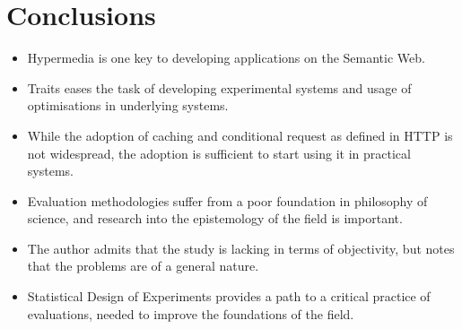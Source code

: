 \section{Conclusions}\label{sec:conclusions}

\begin{itemize}
\item Hypermedia is one key to developing applications on the Semantic
  Web.
\item Traits eases the task of developing experimental systems and
  usage of optimisations in underlying systems.
\item While the adoption of caching and conditional request as defined
  in HTTP is not widespread, the adoption is sufficient to start using
  it in practical systems.
\item Evaluation methodologies suffer from a poor foundation in
  philosophy of science, and research into the epistemology of the
  field is important.
\item The author admits that the study is lacking in terms of
  objectivity, but notes that the problems are of a general nature.
\item Statistical Design of Experiments provides a path to a critical
  practice of evaluations, needed to improve the foundations of the
  field.
\end{itemize}
